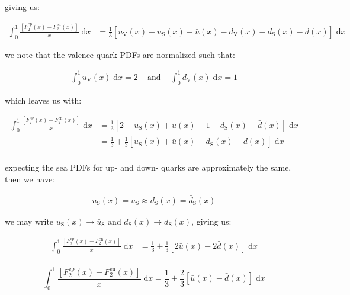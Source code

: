 \documentclass[11pt]{article}
\theoremstyle{definition}
\begin{document}
giving us:

\begin{align}
    \int_0^1 \frac{\left[F_{2}^{\text{ep}}(x) - F_{2}^{\text{en}}(x)\right]}{x}\; \text{d}x
    &=
    \frac{1}{3}[u_{\text{V}}(x) + u_{\text{S}}(x) + \bar{u}(x) - d_{\text{V}}(x) - d_{\text{S}}(x) - \bar{d}(x)]\; \text{d}x
\end{align}

we note that the valence quark PDFs are normalized such that:

\begin{align}
    \int_0^1 u_{\text{V}}(x)\; \text{d}x = 2 \;\;\;\text{ and }\;\;\; \int_0^1 d_{\text{V}}(x)\; \text{d}x = 1
\end{align}

which leaves us with:

\begin{align}
    \int_0^1 \frac{\left[F_{2}^{\text{ep}}(x) - F_{2}^{\text{en}}(x)\right]}{x}\; \text{d}x
    &=
    \frac{1}{3}[2 + u_{\text{S}}(x) + \bar{u}(x) - 1 - d_{\text{S}}(x) - \bar{d}(x)]\; \text{d}x\\
    &=
    \frac{1}{3} +
    \frac{1}{3}[u_{\text{S}}(x) + \bar{u}(x) - d_{\text{S}}(x) - \bar{d}(x)]\; \text{d}x\\
\end{align}

expecting the sea PDFs for up- and down- quarks are approximately the same, then we have:

\begin{align}
    u_{\text{S}}(x) = \bar{u}_{\text{S}} \approx d_{\text{S}}(x) = \bar{d}_{\text{S}}(x)
\end{align}

we may write $u_{\text{S}}(x) \to \bar{u}_{\text{S}}$ and $d_{\text{S}}(x) \to \bar{d}_{\text{S}}(x)$, giving us:

\begin{align}
    \int_0^1 \frac{\left[F_{2}^{\text{ep}}(x) - F_{2}^{\text{en}}(x)\right]}{x}\; \text{d}x
    &=
    \frac{1}{3} +
    \frac{1}{3}[2\bar{u}(x) - 2\bar{d}(x)]\; \text{d}x\\
\end{align}

\begin{equation}
\boxed{
    \int_0^1 \frac{\left[F_{2}^{\text{ep}}(x) - F_{2}^{\text{en}}(x)\right]}{x}\; \text{d}x
    =
    \frac{1}{3} +
    \frac{2}{3}[\bar{u}(x) - \bar{d}(x)]\; \text{d}x
}
\end{equation}
\end{document}
